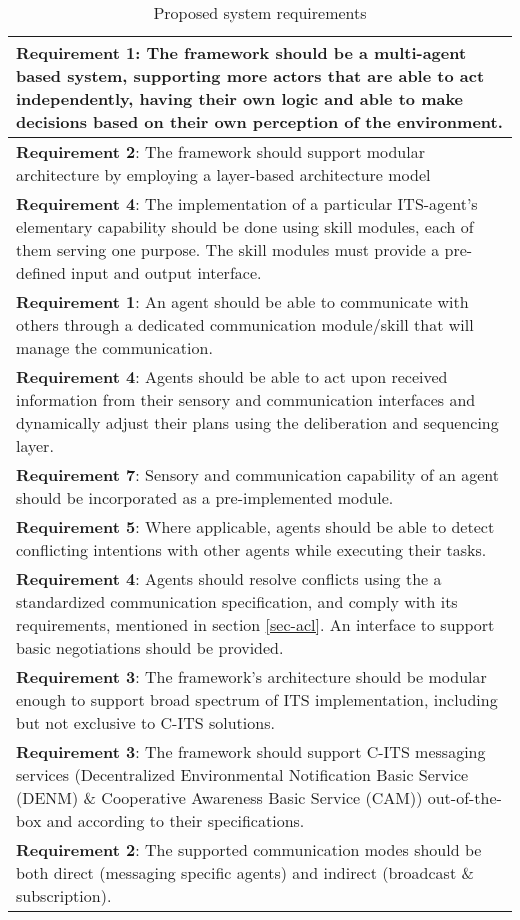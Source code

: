 \documentclass[main.tex]{subfiles}
\begin{document}
\begin{table}[htbp]
    \small
    \caption{Proposed system requirements}
    \centering\begin{tabular}{>{\footnotesize}p{}}
        \toprule 
\textbf{Requirement 1}: The framework should be a multi-agent based system, supporting more actors 
that are able to act independently, having their own logic and able to make decisions based on their 
own perception of the environment.
\\ \midrule
\textbf{Requirement 2}: The framework should support modular architecture by employing a layer-based 
architecture model
\\ \midrule
\textbf{Requirement 4}: The implementation of a particular ITS-agent's elementary
capability should be done using skill modules, each of them serving one purpose. The skill modules must provide a
pre-defined input and output interface.
\\ \midrule
\textbf{Requirement 1}: An agent should be able to communicate with others through a dedicated communication module/skill 
that will manage the communication.
\\ \midrule
\textbf{Requirement 4}: Agents should be able to act upon received information from their sensory and communication interfaces
and dynamically adjust their plans using the deliberation and sequencing layer.
\\ \midrule
\textbf{Requirement 7}: Sensory and communication capability of an agent should be incorporated 
as a pre-implemented module.
\\ \midrule
\textbf{Requirement 5}: Where applicable, agents should be able to detect conflicting intentions with other agents
while executing their tasks. 
\\ \midrule
\textbf{Requirement 4}: Agents should resolve conflicts using the a standardized communication
specification, and comply with its requirements, mentioned in section \ref{sec-acl}. An
interface to support basic negotiations should be provided.
\\ \midrule
\textbf{Requirement 3}: The framework's architecture should be modular enough to support broad 
spectrum of ITS implementation, including but not exclusive to C-ITS solutions.
\\ \midrule
\textbf{Requirement 3}: The framework should support C-ITS messaging services (Decentralized
Environmental Notification Basic Service (DENM) \& Cooperative Awareness Basic Service (CAM))
out-of-the-box and according to their specifications.
\\ \midrule
\textbf{Requirement 2}: The supported communication modes should be both direct (messaging specific agents) and indirect  
(broadcast \& subscription). 
\\ \bottomrule
    \end{tabular}
    \label{sys-requirements}
\end{table}

\clearpage
\end{document}
